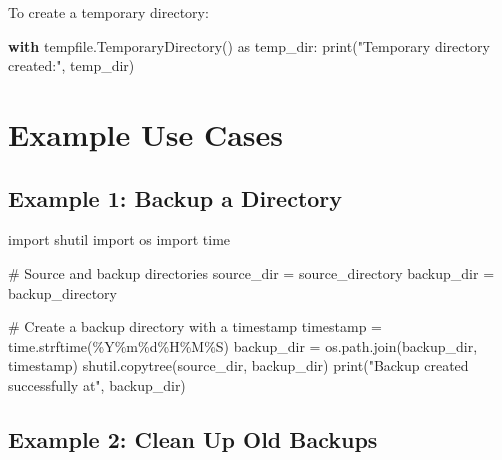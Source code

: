 \documentclass[
  letterpaper,
  DIV=11,
  numbers=noendperiod]{scrreprt}
\newenvironment{Shaded}{\begin{snugshade}}{\end{snugshade}}
\newcommand{\BuiltInTok}[1]{\textcolor[rgb]{0.00,0.23,0.31}{#1}}
\newcommand{\CommentTok}[1]{\textcolor[rgb]{0.37,0.37,0.37}{#1}}
\newcommand{\ControlFlowTok}[1]{\textcolor[rgb]{0.00,0.23,0.31}{\textbf{#1}}}
\newcommand{\ImportTok}[1]{\textcolor[rgb]{0.00,0.46,0.62}{#1}}
\newcommand{\NormalTok}[1]{\textcolor[rgb]{0.00,0.23,0.31}{#1}}
\newcommand{\OperatorTok}[1]{\textcolor[rgb]{0.37,0.37,0.37}{#1}}
\newcommand{\SpecialCharTok}[1]{\textcolor[rgb]{0.37,0.37,0.37}{#1}}
\newcommand{\StringTok}[1]{\textcolor[rgb]{0.13,0.47,0.30}{#1}}
\begin{document}
To create a temporary directory:

\begin{Shaded}
\begin{Highlighting}[]
\ControlFlowTok{with}\NormalTok{ tempfile.TemporaryDirectory() }\ImportTok{as}\NormalTok{ temp\_dir:}
    \BuiltInTok{print}\NormalTok{(}\StringTok{"Temporary directory created:"}\NormalTok{, temp\_dir)}
\end{Highlighting}
\end{Shaded}

\section{Example Use Cases}\label{example-use-cases}

\subsection{Example 1: Backup a
Directory}\label{example-1-backup-a-directory}

\begin{Shaded}
\begin{Highlighting}[]
\ImportTok{import}\NormalTok{ shutil}
\ImportTok{import}\NormalTok{ os}
\ImportTok{import}\NormalTok{ time}

\CommentTok{\# Source and backup directories}
\NormalTok{source\_dir }\OperatorTok{=} \StringTok{\textquotesingle{}source\_directory\textquotesingle{}}
\NormalTok{backup\_dir }\OperatorTok{=} \StringTok{\textquotesingle{}backup\_directory\textquotesingle{}}

\CommentTok{\# Create a backup directory with a timestamp}
\NormalTok{timestamp }\OperatorTok{=}\NormalTok{ time.strftime(}\StringTok{\textquotesingle{}\%Y\%m}\SpecialCharTok{\%d}\StringTok{\%H\%M\%S\textquotesingle{}}\NormalTok{)}
\NormalTok{backup\_dir }\OperatorTok{=}\NormalTok{ os.path.join(backup\_dir, timestamp)}
\NormalTok{shutil.copytree(source\_dir, backup\_dir)}
\BuiltInTok{print}\NormalTok{(}\StringTok{"Backup created successfully at"}\NormalTok{, backup\_dir)}
\end{Highlighting}
\end{Shaded}

\subsection{Example 2: Clean Up Old
Backups}\label{example-2-clean-up-old-backups}
\end{document}
